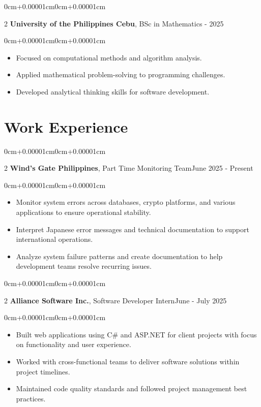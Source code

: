 \documentclass[10pt, letterpaper]{article}
\newenvironment{highlights}{\begin{itemize}[topsep=0.10cm,parsep=0.10cm,partopsep=0pt,itemsep=0pt,leftmargin=0cm+10pt]}{\end{itemize}}
\newenvironment{onecolentry}{\begin{adjustwidth}{0cm+0.00001cm}{0cm+0.00001cm}}{\end{adjustwidth}}
\newenvironment{twocolentry}[2][]{\onecolentry\def\secondColumn{#2}\setcolumnwidth{\fill,8cm}\begin{paracol}{2}}{\switchcolumn \raggedleft \secondColumn\end{paracol}\endonecolentry}
\begin{document}
    \begin{twocolentry}{2022 - 2025}
        \textbf{University of the Philippines Cebu}, BSc in Mathematics\end{twocolentry}
    \vspace{0.10cm}
    \begin{onecolentry}
        \begin{highlights}
            \item Focused on computational methods and algorithm analysis.
            \item Applied mathematical problem-solving to programming challenges.
            \item Developed analytical thinking skills for software development.
        \end{highlights}
    \end{onecolentry}
    \vspace{0.15cm}

\section{Work Experience}
    \begin{twocolentry}{June 2025 - Present}
        \textbf{Wind's Gate Philippines}, Part Time Monitoring Team\end{twocolentry}
    \vspace{0.10cm}
    \begin{onecolentry}
        \begin{highlights}
            \item Monitor system errors across databases, crypto platforms, and various applications to ensure operational stability.
            \item Interpret Japanese error messages and technical documentation to support international operations.
            \item Analyze system failure patterns and create documentation to help development teams resolve recurring issues.
        \end{highlights}
    \end{onecolentry}
    \vspace{0.15cm}

    \begin{twocolentry}{June - July 2025}
        \textbf{Alliance Software Inc.}, Software Developer Intern\end{twocolentry}
    \vspace{0.10cm}
    \begin{onecolentry}
        \begin{highlights}
            \item Built web applications using C\# and ASP.NET for client projects with focus on functionality and user experience.
            \item Worked with cross-functional teams to deliver software solutions within project timelines.
            \item Maintained code quality standards and followed project management best practices.
        \end{highlights}
    \end{onecolentry}
    \vspace{0.15cm}
\end{document}
